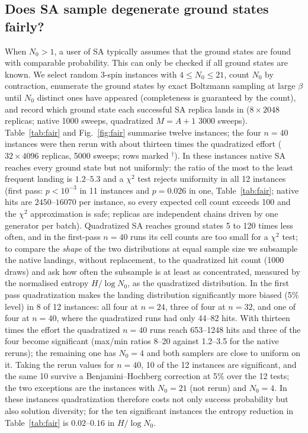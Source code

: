 \documentclass{article}
\newcommand{\N}{N_0}
\begin{document}
\subsection{Does SA sample degenerate ground states fairly?}
\label{sec:exp-fair}
When $\N>1$, a user of SA typically assumes that the ground states are found with comparable probability. This can only be checked if all ground states are known. We select random 3-spin instances with $4\le\N\le21$, count $\N$ by contraction, enumerate the ground states by exact Boltzmann sampling at large $\beta$ until $\N$ distinct ones have appeared (completeness is guaranteed by the count), and record which ground state each successful SA replica lands in ($8\times2048$ replicas; native 1000 sweeps, quadratized $M=A+1$ 3000 sweeps). Table~\ref{tab:fair} and Fig.~\ref{fig:fair} summarise twelve instances; the four $n=40$ instances were then rerun with about thirteen times the quadratized effort ($32\times4096$ replicas, 5000 sweeps; rows marked $^\dagger$). In these instances native SA reaches every ground state but not uniformly: the ratio of the most to the least frequent landing is $1.2$--$5.3$ and a $\chi^2$ test rejects uniformity in all 12 instances (first pass: $p<10^{-3}$ in 11 instances and $p=0.026$ in one, Table~\ref{tab:fair}; native hits are $2450$--$16070$ per instance, so every expected cell count exceeds 100 and the $\chi^2$ approximation is safe; replicas are independent chains driven by one generator per batch). Quadratized SA reaches ground states 5 to 120 times less often, and in the first-pass $n=40$ runs its cell counts are too small for a $\chi^2$ test; to compare the \emph{shape} of the two distributions at equal sample size we subsample the native landings, without replacement, to the quadratized hit count (1000 draws) and ask how often the subsample is at least as concentrated, measured by the normalised entropy $H/\log\N$, as the quadratized distribution. In the first pass quadratization makes the landing distribution significantly more biased (5\% level) in 8 of 12 instances: all four at $n=24$, three of four at $n=32$, and one of four at $n=40$, where the quadratized runs had only 44--82 hits. With thirteen times the effort the quadratized $n=40$ runs reach 653--1248 hits and three of the four become significant (max/min ratios 8--20 against 1.2--3.5 for the native reruns); the remaining one has $\N=4$ and both samplers are close to uniform on it. Taking the rerun values for $n=40$, 10 of the 12 instances are significant, and the same 10 survive a Benjamini--Hochberg correction at 5\% over the 12 tests; the two exceptions are the instances with $\N=21$ (not rerun) and $\N=4$. In these instances quadratization therefore costs not only success probability but also solution diversity; for the ten significant instances the entropy reduction in Table~\ref{tab:fair} is $0.02$--$0.16$ in $H/\log\N$.
\end{document}
